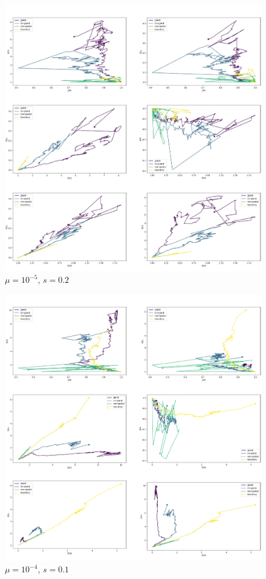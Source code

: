 \begin{figure}[h]
\centering
\includegraphics[width=\textwidth]{Chapter_3/figures/1e0502new.pdf}
\caption{$\mu=10^{-5}$, $s=0.2$}
\label{fig:1e0502new}
\end{figure}

\begin{figure}[h]
\centering
\includegraphics[width=\textwidth]{Chapter_3/figures/1e0401new.pdf}
\caption{$\mu=10^{-4}$, $s=0.1$}
\label{fig:1e0401new}
\end{figure}

